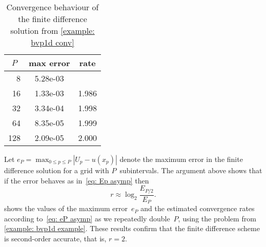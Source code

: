 \begin{table}
\caption{Convergence behaviour of the finite difference solution from
\cref{example: bvp1d conv}}\label{table: bvp1d conv}
\begin{center}
\renewcommand{\arraystretch}{1.2}
\begin{tabular}{r|cc}
\multicolumn{1}{c|}{$P$}&max error&rate\\
\hline
   8&   5.28e-03&\\
  16&   1.33e-03&   1.986\\
  32&   3.34e-04&   1.998\\
  64&   8.35e-05&   1.999\\
 128&   2.09e-05&   2.000
\end{tabular}
\end{center}
\end{table}

\begin{example}\label{example: bvp1d conv}
Let $e_P=\max_{0\le p\le P}|U_p-u(x_p)|$ denote the maximum error in the finite 
difference solution for a grid with $P$~subintervals.  The argument above shows 
that if the error behaves as in~\eqref{eq: Ep asymp} then
\begin{equation}\label{eq: eP asymp}
r\approx\log_2\frac{E_{P/2}}{E_P}.
\end{equation}
 shows the values of the maximum error~$e_P$ and 
the estimated convergence rates according to~\eqref{eq: eP asymp} as we 
repeatedly double~$P$, using the problem from \cref{example: bvp1d example}.
These results confirm that the finite difference scheme is second-order 
accurate, that is, $r=2$.
\end{example}

